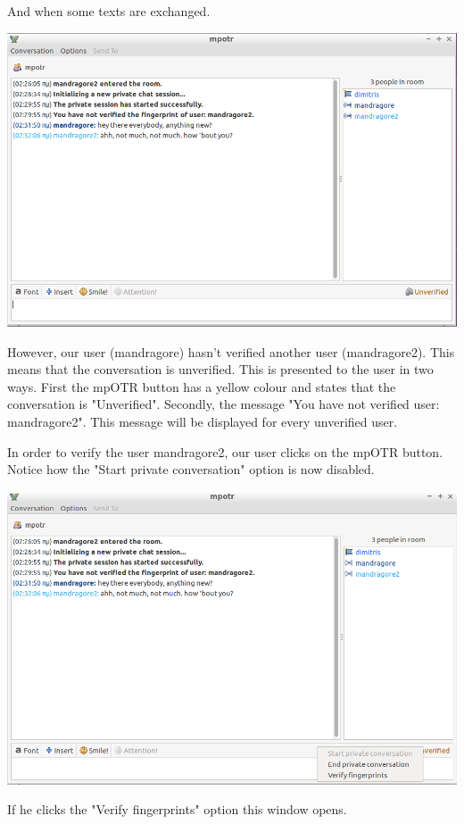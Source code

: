 \documentclass[]{article}
\begin{document}
And when some texts are exchanged.

\includegraphics[scale=0.4]{talking_unverified.png}

However, our user (mandragore) hasn't verified another user (mandragore2).
This means that the conversation is unverified.
This is presented to the user in two ways.
First the mpOTR button has a yellow colour and states that the conversation is "Unverified".
Secondly, the message "You have not verified user: mandragore2".
This message will be displayed for every unverified user.

In order to verify the user mandragore2, our user clicks on the mpOTR button.
Notice how the "Start private conversation" option is now disabled.

\includegraphics[scale=0.4]{click_mpotr_button_unverified.png}

If he clicks the "Verify fingerprints" option this window opens.
\end{document}
